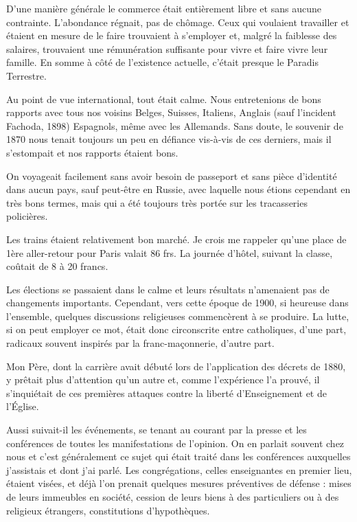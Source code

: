 \documentclass[11pt,a4paper]{report}
\begin{document}
D'une manière générale le commerce était entièrement libre et sans aucune contrainte. L'abondance régnait, pas de chômage. Ceux qui voulaient travailler et étaient en mesure de le faire trouvaient à s'employer et, malgré la faiblesse des salaires, trouvaient une rémunération suffisante pour vivre et faire vivre leur famille. En somme à côté de l'existence actuelle, c'était presque le Paradis Terrestre.

Au point de vue international, tout était calme. Nous entretenions de bons rapports avec tous nos voisins Belges, Suisses, Italiens, Anglais (sauf l'incident Fachoda, 1898) Espagnols, même avec les Allemands. Sans doute, le souvenir de 1870 nous tenait toujours un peu en défiance vis-à-vis de ces derniers, mais il s'estompait et nos rapports étaient bons.

On voyageait facilement sans avoir besoin de passeport et sans pièce d'identité dans aucun pays, sauf peut-être en Russie, avec laquelle nous étions cependant en très bons termes, mais qui a été toujours très portée sur les tracasseries policières.

Les trains étaient relativement bon marché. Je crois me rappeler qu'une place de 1ère aller-retour pour Paris valait 86 frs. La journée d'hôtel, suivant la classe, coûtait de 8 à 20 francs.

Les élections se passaient dans le calme et leurs résultats n'amenaient pas de changements importants. Cependant, vers cette époque de 1900, si heureuse dans l'ensemble, quelques discussions religieuses commencèrent à se produire. La lutte, si on peut employer ce mot, était donc circonscrite entre catholiques, d'une part, radicaux souvent inspirés par la franc-maçonnerie, d'autre part.

Mon Père, dont la carrière avait débuté lors de l'application des décrets de 1880, y prêtait plus d'attention qu'un autre et, comme l'expérience l'a prouvé, il s'inquiétait de ces premières attaques contre la liberté d'Enseignement et de l'Église.

Aussi suivait-il les événements, se tenant au courant par la presse et les conférences de toutes les manifestations de l'opinion. On en parlait souvent chez nous et c'est généralement ce sujet qui était traité dans les conférences auxquelles j'assistais et dont j'ai parlé. Les congrégations, celles enseignantes en premier lieu, étaient visées, et déjà l'on prenait quelques mesures préventives de défense : mises de leurs immeubles en société, cession de leurs biens à des particuliers ou à des religieux étrangers, constitutions d'hypothèques.
\end{document}

